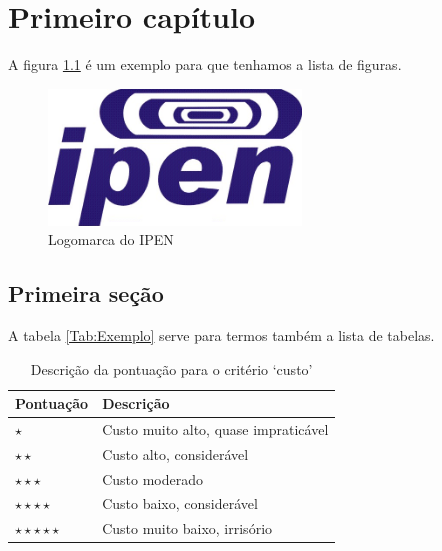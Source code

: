 \documentclass[
	12pt,                       %
	oneside,                    %
	a4paper,                    %
	chapter=TITLE,              %
	section=TITLE,              %
	brazil                      %
    sumario=tradicional         %
]{abntex2}
\begin{document}
\lipsum[50]

\chapter{Primeiro capítulo}

A figura \ref{Fig:Logomarca} é um exemplo para que tenhamos a lista de figuras. \lipsum[20]

\begin{figure}[htb]
  \caption{Logomarca do IPEN}
  \begin{center}
	\includegraphics[width=0.6\textwidth]{./ipen.png}
  \end{center}
  \label{Fig:Logomarca}
\end{figure}

\lipsum[20]

\section{Primeira seção}

A tabela \ref{Tab:Exemplo} serve para termos também a lista de tabelas. \lipsum[20]

\begin{table}[htb]

  \centering
  \ABNTEXfontereduzida

  \caption{Descrição da pontuação para o critério `custo'}

  \label{Tab:Custo}

  \begin{tabular}{p{2cm}|p{10cm}}

    \textbf{Pontuação} & \textbf{Descrição} \\

    \hline

    $\star$ &
    Custo muito alto, quase impraticável \\

    $\star\star$ &
    Custo alto, considerável \\

    $\star\star\star$ &
    Custo moderado \\

    $\star\star\star\star$ &
    Custo baixo, considerável \\

    $\star\star\star\star\star$ &
    Custo muito baixo, irrisório  \\

    \hline

  \end{tabular}

\end{table}
\end{document}
